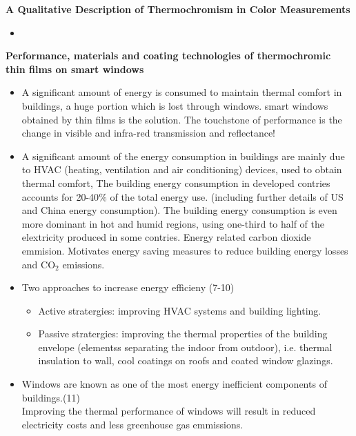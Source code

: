 \newpage
\cite{renewableSustainableEnergyRev}
\textbf{A Qualitative Description of Thermochromism in Color Measurements} \\
\begin{itemize}
\item
\end{itemize}

      
\newpage
\cite{Kamalisarvestani2013}
\textbf{Performance, materials and coating technologies of thermochromic thin films on smart windows} \\
\begin{itemize}
\item A significant amount of energy is consumed to maintain thermal comfort in buildings, 
   a huge portion which is lost through windows. 
   smart windows obtained by thin films is the solution. The touchstone of performance 
   is the change in visible and infra-red transmission and reflectance!
\item A significant amount of the energy consumption in buildings are mainly due to HVAC (heating, ventilation 
   and air conditioning) devices, used to obtain thermal comfort,
   The building energy consumption in developed contries accounts for 20-40$\%$ of the total energy use.
   (including further details of US and China energy consumption). The building energy consumption is even more
   dominant in hot and humid regions, using one-third to half of the elextricity produced in some contries.
   Energy related carbon dioxide emmision. Motivates energy saving measures to reduce building energy losses and CO$_2$
   emissions.
\item Two approaches to increase energy efficieny (7-10)
   \begin{itemize}
      \item Active stratergies: improving HVAC systems and building lighting.
      \item Passive stratergies: improving the thermal properties of the building envelope (elementss
         separating the indoor from outdoor), i.e. thermal insulation to wall, cool coatings on roofs
                  and coated window glazings.
   \end{itemize}
\item Windows are known as one of the most energy inefficient components of buildings.(11) \\
      Improving the thermal performance of windows will result in reduced electricity costs 
      and less greenhouse gas emmissions. \\

\end{itemize}
